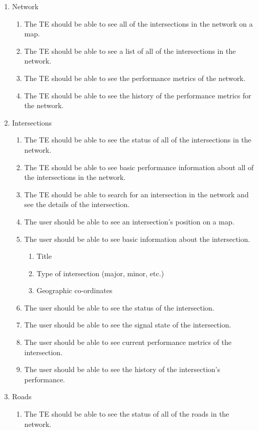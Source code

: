 \documentclass{report}
\begin{document}
\begin{enumerate}
  \item Network
  \begin{enumerate}
    \item The TE should be able to see all of the intersections in the network on a map.
    \item The TE should be able to see a list of all of the intersections in the network.
    \item The TE should be able to see the performance metrics of the network.
    \item The TE should be able to see the history of the performance metrics for the network.
  \end{enumerate}
  \item Intersections
  \begin{enumerate}
    \item The TE should be able to see the status of all of the intersections in the network.
    \item The TE should be able to see basic performance information about all of the intersections in the network.
    \item The TE should be able to search for an intersection in the network and see the details of the intersection.
    \item The user should be able to see an intersection's position on a map.
    \item The user should be able to see basic information about the intersection.
    \begin{enumerate}
    	\item Title
	\item Type of intersection (major, minor, etc.)
	\item Geographic co-ordinates
    \end{enumerate}
    \item The user should be able to see the status of the intersection.
    \item The user should be able to see the signal state of the intersection.
    \item The user should be able to see current performance metrics of the intersection.
    \item The user should be able to see the history of the intersection's performance.
  \end{enumerate}
  \item Roads
  \begin{enumerate}
    \item The TE should be able to see the status of all of the roads in the network.

\end{enumerate}
\end{enumerate}
\end{document}

